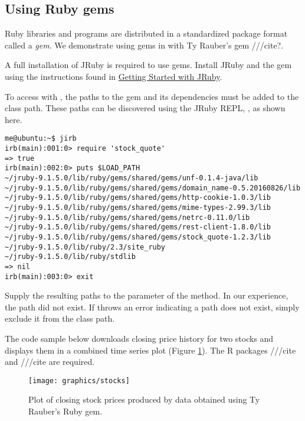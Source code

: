 \hypertarget{usingrubygems}{\subsection{Using Ruby gems}}

Ruby libraries and programs are distributed in a standardized package format called a \textit{gem}. We demonstrate using gems in  with Ty Rauber's \href{https://github.com/tyrauber/stock_quote}{} gem ///cite?. 

A full installation of JRuby is required to use gems. Install JRuby and the  gem using the instructions found in \href{https://github.com/jruby/jruby/wiki/GettingStarted}{Getting Started with JRuby}.%

To access  with , the paths to the gem and its dependencies must be added to the  class path. These paths can be discovered using the JRuby REPL, , as shown here.

\begin{verbatim}
me@ubuntu:~$ jirb
irb(main):001:0> require 'stock_quote'
=> true
irb(main):002:0> puts $LOAD_PATH
~/jruby-9.1.5.0/lib/ruby/gems/shared/gems/unf-0.1.4-java/lib
~/jruby-9.1.5.0/lib/ruby/gems/shared/gems/domain_name-0.5.20160826/lib
~/jruby-9.1.5.0/lib/ruby/gems/shared/gems/http-cookie-1.0.3/lib
~/jruby-9.1.5.0/lib/ruby/gems/shared/gems/mime-types-2.99.3/lib
~/jruby-9.1.5.0/lib/ruby/gems/shared/gems/netrc-0.11.0/lib
~/jruby-9.1.5.0/lib/ruby/gems/shared/gems/rest-client-1.8.0/lib
~/jruby-9.1.5.0/lib/ruby/gems/shared/gems/stock_quote-1.2.3/lib
~/jruby-9.1.5.0/lib/ruby/2.3/site_ruby
~/jruby-9.1.5.0/lib/ruby/stdlib
=> nil
irb(main):003:0> exit
\end{verbatim}

Supply the resulting paths to the  parameter of the   method. In our experience, the  path did not exist. If  throws an error indicating a path does not exist, simply exclude it from the class path.

The code sample below downloads closing price history for two stocks and displays them in a combined time series plot (Figure \ref{fig:stocks}). The R packages  ///cite and  ///cite are required. %

\begin{figure}[h]
\centering
\texttt{[image: graphics/stocks]}
\caption{Plot of closing stock prices produced by data obtained using Ty Rauber's  Ruby gem.}
\label{fig:stocks}
\end{figure}

